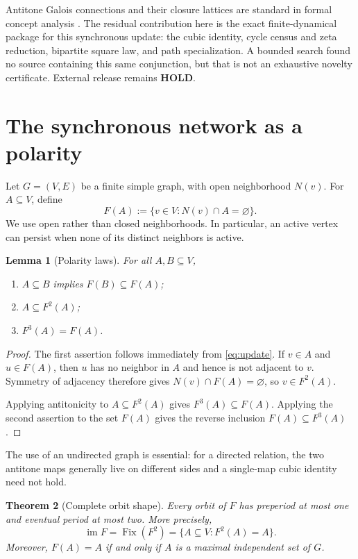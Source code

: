 \documentclass[11pt,a4paper]{amsart}
\newtheorem{theorem}{Theorem}[section]
\newtheorem{lemma}[theorem]{Lemma}
\theoremstyle{definition}
\theoremstyle{remark}
\newcommand{\Fix}{\operatorname{Fix}}
\newcommand{\im}{\operatorname{im}}
\begin{document}
Antitone Galois connections and their closure lattices are standard in
formal concept analysis \cite{GanterWille1999}.  The residual contribution
here is the exact finite-dynamical package for this synchronous update: the
cubic identity, cycle census and zeta reduction, bipartite square law, and
path specialization.  A bounded search found no source containing this
same conjunction, but that is not an exhaustive novelty certificate.
External release remains \textbf{HOLD}.

\section{The synchronous network as a polarity}

Let $G=(V,E)$ be a finite simple graph, with open neighborhood $N(v)$.
For $A\subseteq V$, define
\begin{equation}\label{eq:update}
 F(A):=\{v\in V:N(v)\cap A=\varnothing\}.
\end{equation}
We use open rather than closed neighborhoods.  In particular, an active
vertex can persist when none of its distinct neighbors is active.

\begin{lemma}[Polarity laws]\label{lem:polarity}
For all $A,B\subseteq V$,
\begin{enumerate}
\item $A\subseteq B$ implies $F(B)\subseteq F(A)$;
\item $A\subseteq F^2(A)$;
\item $F^3(A)=F(A)$.
\end{enumerate}
\end{lemma}

\begin{proof}
The first assertion follows immediately from \eqref{eq:update}.  If
$v\in A$ and $u\in F(A)$, then $u$ has no neighbor in $A$ and hence is not
adjacent to $v$.  Symmetry of adjacency therefore gives
$N(v)\cap F(A)=\varnothing$, so $v\in F^2(A)$.

Applying antitonicity to $A\subseteq F^2(A)$ gives
$F^3(A)\subseteq F(A)$.  Applying the second assertion to the set $F(A)$
gives the reverse inclusion $F(A)\subseteq F^3(A)$.
\end{proof}

The use of an undirected graph is essential: for a directed relation, the
two antitone maps generally live on different sides and a single-map cubic
identity need not hold.

\begin{theorem}[Complete orbit shape]\label{thm:orbit}
Every orbit of $F$ has preperiod at most one and eventual period at most
two.  More precisely,
\[
 \im F=\Fix(F^2)=\{A\subseteq V:F^2(A)=A\}.
\]
Moreover, $F(A)=A$ if and only if $A$ is a maximal independent set of $G$.
\end{theorem}
\end{document}
